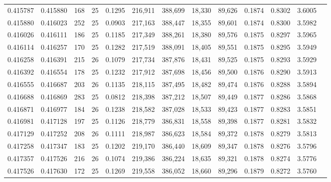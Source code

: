 \begin{tabular}{rrrrrrrrrrrrr}
0.415787 & 0.415880 & 168 &  25 &                                     0.1295 & 216,911 & 388,699 &  18,330 &  89,626 & 0.1874 & 0.8302 & 3.6005 \\
0.415880 & 0.416023 & 252 &  25 &                                     0.0903 & 217,163 & 388,447 &  18,355 &  89,601 & 0.1874 & 0.8300 & 3.5982 \\
0.416026 & 0.416111 & 186 &  25 &                                     0.1185 & 217,349 & 388,261 &  18,380 &  89,576 & 0.1875 & 0.8297 & 3.5965 \\
0.416114 & 0.416257 & 170 &  25 &                                     0.1282 & 217,519 & 388,091 &  18,405 &  89,551 & 0.1875 & 0.8295 & 3.5949 \\
0.416258 & 0.416391 & 215 &  26 &                                     0.1079 & 217,734 & 387,876 &  18,431 &  89,525 & 0.1875 & 0.8293 & 3.5929 \\
0.416392 & 0.416554 & 178 &  25 &                                     0.1232 & 217,912 & 387,698 &  18,456 &  89,500 & 0.1876 & 0.8290 & 3.5913 \\
0.416555 & 0.416687 & 203 &  26 &                                     0.1135 & 218,115 & 387,495 &  18,482 &  89,474 & 0.1876 & 0.8288 & 3.5894 \\
0.416688 & 0.416869 & 283 &  25 &                                     0.0812 & 218,398 & 387,212 &  18,507 &  89,449 & 0.1877 & 0.8286 & 3.5868 \\
0.416871 & 0.416977 & 184 &  26 &                                     0.1238 & 218,582 & 387,028 &  18,533 &  89,423 & 0.1877 & 0.8283 & 3.5851 \\
0.416981 & 0.417128 & 197 &  25 &                                     0.1126 & 218,779 & 386,831 &  18,558 &  89,398 & 0.1877 & 0.8281 & 3.5832 \\
0.417129 & 0.417252 & 208 &  26 &                                     0.1111 & 218,987 & 386,623 &  18,584 &  89,372 & 0.1878 & 0.8279 & 3.5813 \\
0.417258 & 0.417347 & 183 &  25 &                                     0.1202 & 219,170 & 386,440 &  18,609 &  89,347 & 0.1878 & 0.8276 & 3.5796 \\
0.417357 & 0.417526 & 216 &  26 &                                     0.1074 & 219,386 & 386,224 &  18,635 &  89,321 & 0.1878 & 0.8274 & 3.5776 \\
0.417526 & 0.417630 & 172 &  25 &                                     0.1269 & 219,558 & 386,052 &  18,660 &  89,296 & 0.1879 & 0.8272 & 3.5760 \\

\end{tabular}
